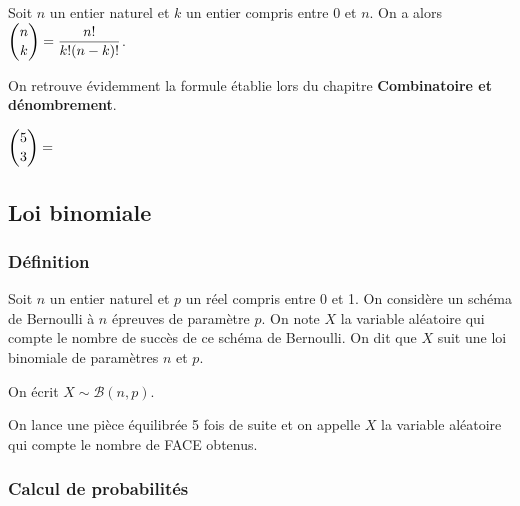 \documentclass[11pt,fleqn, openany]{book} %
\begin{document}
\begin{proposition}Soit $n$ un entier naturel et $k$ un entier compris entre 0 et $n$. On a alors $\dbinom{n}{k} = \dfrac{n!}{k!(n-k)!}$.\end{proposition}

On retrouve évidemment la formule établie lors du chapitre \textbf{Combinatoire et dénombrement}.

\begin{example} $\dbinom{5}{3} = $\end{example}


\subsection{Loi binomiale}

\subsubsection{Définition}

\begin{definition}Soit $n$ un entier naturel et $p$ un réel compris entre 0 et 1. On considère un schéma de Bernoulli à $n$ épreuves de paramètre $p$. On note $X$ la variable aléatoire qui compte le nombre de succès de ce schéma de Bernoulli. On dit que $X$ suit une loi binomiale de paramètres $n$ et $p$.

 On écrit $X\sim \mathcal{B}(n,p)$.\end{definition}

\begin{example}On lance une pièce équilibrée 5 fois de suite et on appelle $X$ la variable aléatoire qui compte le nombre de FACE obtenus.


\vskip60pt

\end{example}

\subsubsection{Calcul de probabilités}
\end{document}

